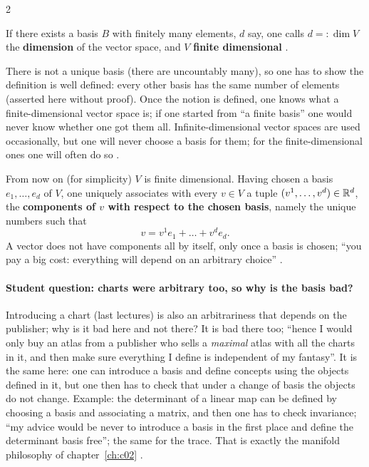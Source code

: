 \begin{paracol}{2}
\begin{definition}\label{def:c03-dim}
If there exists a basis $B$ with finitely many elements, $d$ say, one calls $d=:\dim V$ the \textbf{dimension} of the vector space, and $V$ \textbf{finite dimensional}
.
\end{definition}
There is not a unique basis (there are uncountably many), so one has to show the definition is well defined: every other basis has the same number of elements (asserted here without proof). Once the notion is defined, one knows what a finite-dimensional vector space is; if one started from ``a finite basis''
one would never know whether one got them all. Infinite-dimensional vector spaces are used occasionally, but one will never choose a basis for them; for the finite-dimensional ones one will often do so .

\begin{remark}\label{rem:c03-components}
From now on (for simplicity) $V$ is finite dimensional. Having chosen a basis $e_1,\dots,e_d$ of $V$, one uniquely associates with every $v\in V$ a tuple $(v^1,\dots,v^d)\in\mathbb{R}^d$, the \textbf{components of $v$ with respect to the chosen basis}, namely the unique numbers such that
\[
  v=v^1e_1+\dots+v^de_d.
\]
A vector does not have components all by itself, only once a basis is chosen; ``you pay a big cost: everything will depend on an arbitrary choice'' .
\end{remark}

\paragraph{Student question: charts were arbitrary too, so why is the basis bad?} Introducing a chart (last lectures) is also an arbitrariness that depends on the publisher; why is it bad here and not there? It is bad there too; ``hence I would only buy an atlas from a publisher who sells a \emph{maximal} atlas with all the charts in it, and then make sure everything I define is independent of
my fantasy''. It is the same here: one can introduce a basis and define concepts using the objects defined in it, but one then has to check that under a change of basis the objects do not change. Example: the determinant of a linear map can be defined by choosing a basis and associating a matrix, and then one has to check invariance;
``my advice would be never to introduce a basis in the first place and define the determinant basis free''; the same for the trace. That is exactly the manifold philosophy of chapter~\ref{ch:c02} .


\end{paracol}
